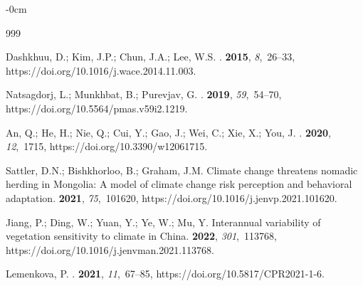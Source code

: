 \documentclass[geosciences,article,accept,pdftex,oneauthor]{Definitions/mdpi}
\begin{document}
\begin{adjustwidth}{-\extralength}{0cm}


\begin{thebibliography}{999}

Dashkhuu, D.; Kim, J.P.; Chun, J.A.; Lee, W.S.
.
 {\bf 2015}, {\em 8},~26--33, https://doi.org/10.1016/j.wace.2014.11.003.

Natsagdorj, L.; Munkhbat, B.; Purevjav, G.
.
 {\bf 2019},
  {\em 59},~54--70, https://doi.org/10.5564/pmas.v59i2.1219.

An, Q.; He, H.; Nie, Q.; Cui, Y.; Gao, J.; Wei, C.; Xie, X.; You, J.
.
 {\bf 2020}, {\em 12},~1715, https://doi.org/10.3390/w12061715.

Sattler, D.N.; Bishkhorloo, B.; Graham, J.M.
\newblock Climate change threatens nomadic herding in Mongolia: A model of
  climate change risk perception and behavioral adaptation.
 {\bf 2021}, {\em
  75},~101620, https://doi.org/10.1016/j.jenvp.2021.101620.

Jiang, P.; Ding, W.; Yuan, Y.; Ye, W.; Mu, Y.
\newblock Interannual variability of vegetation sensitivity to climate in
  China.
 {\bf 2022}, {\em
  301},~113768, https://doi.org/10.1016/j.jenvman.2021.113768.

Lemenkova, P.
.
 {\bf 2021}, {\em 11},~67--85, https://doi.org/10.5817/CPR2021-1-6.


\end{thebibliography}
\end{adjustwidth}
\end{document}
